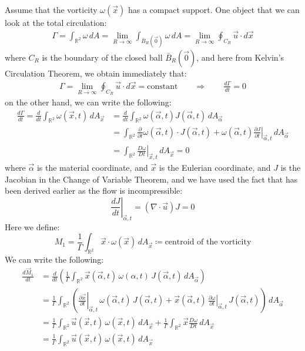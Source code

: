 \documentclass[11pt]{book}
\theoremstyle{break}
\theoremstyle{break}
\newcommand{\R}{\mathbb{R}}
\newcommand{\pd}{\partial}
\begin{document}
Assume that the vorticity $\omega(\vec{x})$ has a compact support. One object that we can look at the total circulation:
\begin{align*}
\Gamma =\int_{\R^2} \omega \, dA = \lim_{R\to \infty}\int_{\bar{B}_R(\vec{0})}\omega \, dA = \lim_{R \to \infty}\oint_{C_R}\vec{u}\cdot d\vec{x}
\end{align*}
where $C_R$ is the boundary of the closed ball $\bar{B}_R(\vec{0})$, and here from Kelvin's Circulation Theorem, we obtain immediately that:
\begin{align*}
\Gamma =  \lim_{R \to \infty}\oint_{C_R}\vec{u}\cdot d\vec{x} = \text{constant} \qquad \Rightarrow \qquad \frac{d\Gamma}{dt} = 0
\end{align*}
on the other hand, we can write the following:
\begin{align*}
\frac{d\Gamma}{dt} = \frac{d}{dt}\int_{\R^2} \omega(\vec{x},t)\, dA_{\vec{x}} 
&= \frac{d}{dt}\int_{\R^2} \omega(\vec{\alpha}, t) J(\vec{\alpha}, t) \, dA_{\vec{\alpha}}\\
&=\int_{\R^2} \frac{\pd}{\pd t}\omega(\vec{\alpha}, t) \cdot J(\vec{\alpha},t) + \omega(\vec{\alpha},t ) \left.\frac{\pd J }{\pd t}\right|_{\vec{\alpha},t}\, dA_{\vec{\alpha}}\\
&= \int_{\R^2} \left.\frac{D\omega}{Dt}\right|_{\vec{x},t}\, dA_{\vec{x}} = 0
\end{align*}
where $\vec{\alpha}$ is the material coordinate, and $\vec{x}$ is the Eulerian coordinate, and $J$ is the Jacobian in the Change of Variable Theorem, and we have used the fact that has been derived earlier as the flow is incompressible:
$$\left.\frac{dJ}{dt}\right|_{\vec{\alpha},t} = (\nabla \cdot \vec{u}) J = 0$$
Here we define: 
$$M_1 = \frac{1}{\Gamma}\int_{\R^2}\vec{x}\cdot \omega(\vec{x})\, dA_{\vec{x}}\coloneqq\text{centroid of the vorticity}$$
We can write the following:
\begin{align*}
\frac{d\vec{M}_1}{dt} 
&= \frac{d}{dt}\left(\frac{1}{\Gamma} \int_{\R^2} \vec{x}(\vec{\alpha},t)\, \omega(\alpha,t)\, J(\vec{\alpha},t)\, dA_{\vec{\alpha}} \right)\\
&= \frac{1}{\Gamma}\int_{\R^2} \left(\left.\frac{\pd \vec{x}}{\pd t}\right|_{\vec{\alpha},t} \, \omega(\vec{\alpha},t) \, J(\vec{\alpha},t) + \vec{x}(\vec{\alpha},t) \, \left.\frac{\pd \omega}{\pd t}\right|_{\vec{\alpha},t}\, J(\vec{\alpha},t)\right)\, dA_{\vec{\alpha}}\\
&= \frac{1}{\Gamma}\int_{\R^2}  \vec{u}(\vec{x},t) \, \omega(\vec{x},t) \, dA_{\vec{x}} + \frac{1}{\Gamma}\int_{\R^2}\vec{x}\frac{D\omega}{Dt}\, dA_{\vec{x}}\\
&= \frac{1}{\Gamma}\int_{\R^2}  \vec{u}(\vec{x},t) \, \omega(\vec{x},t) \, dA_{\vec{x}}
\end{align*}
\end{document}
